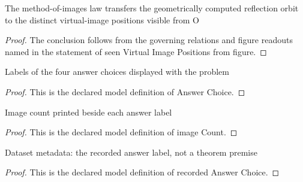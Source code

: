 \begin{lemma}
  \label{lem:physics:phyx-mini-0068:phyxminiproblems-problemphyxmini0068-seenvirtualimagepositions-from-figure}
  The method-of-images law transfers the geometrically computed reflection orbit to the distinct virtual-image positions visible from O
\end{lemma}
\begin{proof}
  The conclusion follows from the governing relations and figure readouts named in the statement of seen Virtual Image Positions from figure.
\end{proof}
\begin{definition}
  \label{def:physics:phyx-mini-0068:phyxminiproblems-problemphyxmini0068-answerchoice}
  Labels of the four answer choices displayed with the problem
\end{definition}
\begin{proof}
  This is the declared model definition of Answer Choice.
\end{proof}
\begin{definition}
  \label{def:physics:phyx-mini-0068:phyxminiproblems-problemphyxmini0068-answerchoice-imagecount}
  Image count printed beside each answer label
\end{definition}
\begin{proof}
  This is the declared model definition of image Count.
\end{proof}
\begin{definition}
  \label{def:physics:phyx-mini-0068:phyxminiproblems-problemphyxmini0068-recordedanswerchoice}
  Dataset metadata: the recorded answer label, not a theorem premise
\end{definition}
\begin{proof}
  This is the declared model definition of recorded Answer Choice.
\end{proof}

